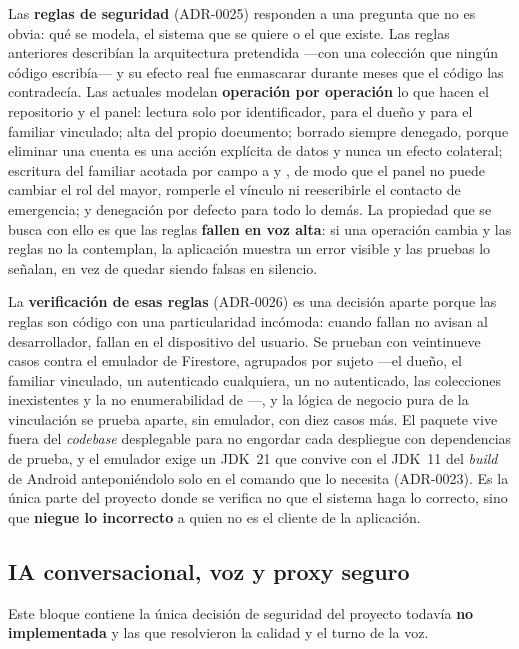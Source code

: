 Las \textbf{reglas de seguridad} (ADR-0025) responden a una pregunta que no es obvia: qué se modela, el
sistema que se quiere o el que existe. Las reglas anteriores describían la arquitectura pretendida ---con
una colección  que ningún código escribía--- y su efecto real fue enmascarar durante meses
que el código las contradecía. Las actuales modelan \textbf{operación por operación} lo que hacen el
repositorio y el panel: lectura solo por identificador, para el dueño y para el familiar vinculado; alta del
propio documento; borrado siempre denegado, porque eliminar una cuenta es una acción explícita de datos y
nunca un efecto colateral; escritura del familiar acotada por campo a  y , de
modo que el panel no puede cambiar el rol del mayor, romperle el vínculo ni reescribirle el contacto de
emergencia; y denegación por defecto para todo lo demás. La propiedad que se busca con ello es que las
reglas \textbf{fallen en voz alta}: si una operación cambia y las reglas no la contemplan, la aplicación
muestra un error visible y las pruebas lo señalan, en vez de quedar siendo falsas en silencio.

La \textbf{verificación de esas reglas} (ADR-0026) es una decisión aparte porque las reglas son código con
una particularidad incómoda: cuando fallan no avisan al desarrollador, fallan en el dispositivo del usuario.
Se prueban con veintinueve casos contra el emulador de Firestore, agrupados por sujeto ---el dueño, el
familiar vinculado, un autenticado cualquiera, un no autenticado, las colecciones inexistentes y la no
enumerabilidad de ---, y la lógica de negocio pura de la vinculación se prueba aparte, sin
emulador, con diez casos más. El paquete vive fuera del \emph{codebase} desplegable para no engordar cada
despliegue con dependencias de prueba, y el emulador exige un JDK~21 que convive con el JDK~11 del
\emph{build} de Android anteponiéndolo solo en el comando que lo necesita (ADR-0023). Es la única parte del
proyecto donde se verifica no que el sistema haga lo correcto, sino que \textbf{niegue lo incorrecto} a
quien no es el cliente de la aplicación.

\subsection{IA conversacional, voz y proxy seguro}

Este bloque contiene la única decisión de seguridad del proyecto todavía \textbf{no implementada} y las
que resolvieron la calidad y el turno de la voz.

